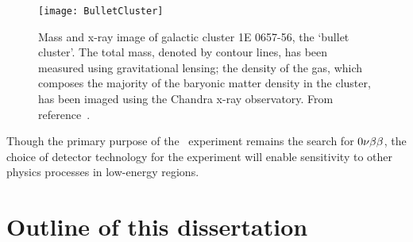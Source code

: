 		\begin{figure}
			\centering
			\texttt{[image: BulletCluster]}
			\caption[Mass and x-ray image of galactic cluster 1E 0657-56.]{ Mass and x-ray image of galactic cluster 1E 0657-56, 
			the `bullet cluster'.   The total mass, denoted by contour lines, has been measured using gravitational lensing; the 
			density of the gas, which composes the majority of the baryonic matter density in the cluster, has been imaged 
			using the Chandra x-ray observatory.  From reference~\cite{Clowe06}.}
			\label{fig:DMBulletCluster}
		\end{figure}	
	

Though the primary purpose of the \MJ~experiment remains the search for $0 \nu \beta \beta$, the choice of detector technology for the experiment will enable sensitivity to other physics processes in low-energy regions.  
	
	\section{Outline of this dissertation}
